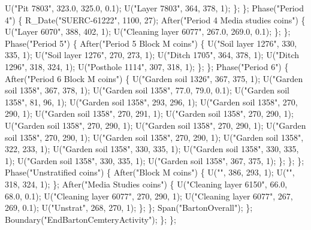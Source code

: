 \documentclass[
]{agujournal2019}
\newenvironment{Shaded}{\begin{snugshade}}{\end{snugshade}}
\newcommand{\NormalTok}[1]{\textcolor[rgb]{0.00,0.23,0.31}{#1}}
\begin{document}
\begin{tcolorbox}
\begin{Shaded}
\begin{Highlighting}[]
\NormalTok{       U("Pit 7803", 323.0, 325.0, 0.1);}
\NormalTok{       U("Layer 7803", 364, 378, 1);}
\NormalTok{      \};}
\NormalTok{     \};}
\NormalTok{     Phase("Period 4")}
\NormalTok{     \{}
\NormalTok{      R\_Date("SUERC{-}61222", 1100, 27);}
\NormalTok{      After("Period 4 Media studies coins")}
\NormalTok{      \{}
\NormalTok{       U("Layer 6070", 388, 402, 1);}
\NormalTok{       U("Cleaning layer 6077", 267.0, 269.0, 0.1);}
\NormalTok{      \};}
\NormalTok{     \};}
\NormalTok{     Phase("Period 5")}
\NormalTok{     \{}
\NormalTok{      After("Period 5 Block M coins")}
\NormalTok{      \{}
\NormalTok{       U("Soil layer 1276", 330, 335, 1);}
\NormalTok{       U("Soil layer 1276", 270, 273, 1);}
\NormalTok{       U("Ditch 1705", 364, 378, 1);}
\NormalTok{       U("Ditch 1296", 318, 324, 1);}
\NormalTok{       U("Posthole 1114", 307, 318, 1);}
\NormalTok{      \};}
\NormalTok{     \};}
\NormalTok{     Phase("Period 6")}
\NormalTok{     \{}
\NormalTok{      After("Period 6 Block M coins")}
\NormalTok{      \{}
\NormalTok{       U("Garden soil 1326", 367, 375, 1);}
\NormalTok{       U("Garden soil 1358", 367, 378, 1);}
\NormalTok{       U("Garden soil 1358", 77.0, 79.0, 0.1);}
\NormalTok{       U("Garden soil 1358", 81, 96, 1);}
\NormalTok{       U("Garden soil 1358", 293, 296, 1);}
\NormalTok{       U("Garden soil 1358", 270, 290, 1);}
\NormalTok{       U("Garden soil 1358", 270, 291, 1);}
\NormalTok{       U("Garden soil 1358", 270, 290, 1);}
\NormalTok{       U("Garden soil 1358", 270, 290, 1);}
\NormalTok{       U("Garden soil 1358", 270, 290, 1);}
\NormalTok{       U("Garden soil 1358", 270, 290, 1);}
\NormalTok{       U("Garden soil 1358", 270, 290, 1);}
\NormalTok{       U("Garden soil 1358", 322, 233, 1);}
\NormalTok{       U("Garden soil 1358", 330, 335, 1);}
\NormalTok{       U("Garden soil 1358", 330, 335, 1);}
\NormalTok{       U("Garden soil 1358", 330, 335, 1);}
\NormalTok{       U("Garden soil 1358", 367, 375, 1);}
\NormalTok{      \};}
\NormalTok{     \};}
\NormalTok{    \};}
\NormalTok{    Phase("Unstratified coins")}
\NormalTok{    \{}
\NormalTok{     After("Block M coins")}
\NormalTok{     \{}
\NormalTok{      U("", 386, 293, 1);}
\NormalTok{      U("", 318, 324, 1);}
\NormalTok{     \};}
\NormalTok{     After("Media Studies coins")}
\NormalTok{     \{}
\NormalTok{      U("Cleaning layer 6150", 66.0, 68.0, 0.1);}
\NormalTok{      U("Cleaning layer 6077", 270, 290, 1);}
\NormalTok{      U("Cleaning layer 6077", 267, 269, 0.1);}
\NormalTok{      U("Unstrat", 268, 270, 1);}
\NormalTok{     \};}
\NormalTok{    \};}
\NormalTok{    Span("BartonOverall");}
\NormalTok{   \};}
\NormalTok{   Boundary("EndBartonCemteryActivity");}
\NormalTok{  \};}
\NormalTok{ \};}
\end{Highlighting}
\end{Shaded}

\end{tcolorbox}
\end{document}
